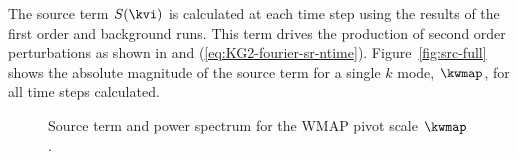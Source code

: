 The source term $S(\kvi)$ is calculated at each time step using the
results of the first order and background runs. This term drives the
production of second order perturbations as shown in
 and
(\ref{eq:KG2-fourier-sr-ntime}). Figure~\ref{fig:src-full} shows the
absolute magnitude of the source term for a single $k$ mode, $\kwmap$,
for all time steps calculated.
% 
\begin{figure}
% 
\caption{Source term and power spectrum for the WMAP pivot scale $\kwmap$.}
\end{figure}
